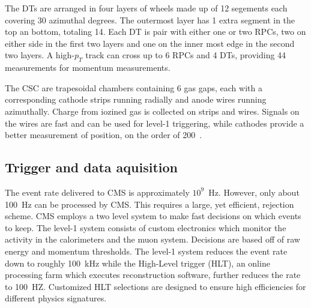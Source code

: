 The DTs are arranged in four layers of wheels made up of 12 segements
each covering 30 azimuthal degrees.  The outermost layer has 1 extra 
segment in the top an bottom, totaling 14.  Each DT is pair with either
one or two RPCs, two on either side in the first two layers and one on
the inner most edge in the second two layers.  A high-$p_T$ track can 
cross up to 6 RPCs and 4 DTs, providing 44 measurements for momentum 
measurements. 

The CSC are trapesoidal chambers containing 6 gas gaps, each with a 
corresponding cathode strips running radially and anode wires running
azimuthally.  Charge from iozined gas is collected on strips and wires.
Signals on the wires are fast and can be used for level-1 triggering,
while cathodes provide a better measurement of position, on the order
of 200~\microns.

\subsection{Trigger and data aquisition}

The event rate delivered to CMS is approximately $10^9$~Hz.  
However, only about 100~Hz can be processed by CMS.  
This requires a large, yet efficient, rejection scheme.  
CMS employs a two level system to make fast decisions on 
which events to keep.  The level-1 system consists of 
custom electronics which monitor the activity in the calorimeters
and the muon system.   Decisions are based off of raw energy
and momentum thresholds.  The level-1 system reduces the
event rate down to roughly 100~kHz while the High-Level 
trigger (HLT), an online
processing farm which executes reconstruction software, 
further reduces the rate to 100~HZ.  Customized HLT selections
are designed to ensure high efficiencies for different 
physics signatures.  

